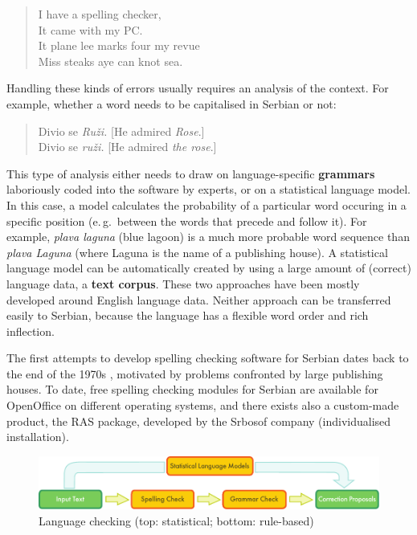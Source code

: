 \begin{multicols}{2}
\begin{quote}
 I have a spelling checker, \\
 It came with my PC. \\
 It plane lee marks four my revue \\
 Miss steaks aye can knot sea. 
\end{quote}

Handling these kinds of errors usually requires an analysis of the context. For example, whether a word needs to be capitalised in Serbian or not:

\begin{quote}
Divio se \textit{Ruži.} [He admired \textit{Rose}.]\\
Divio se \textit{ruži.} [He admired \textit{the rose}.]
\end{quote}

This type of analysis either needs to draw on language-specific \textbf{grammars} laboriously coded into the software by experts, or on a statistical language model. In this case, a model calculates the probability of a particular word occuring in a specific position (e.\,g.~between the words that precede and follow it). For example, \textit{plava laguna} (blue lagoon) is a much more probable word sequence than \textit{plava Laguna} (where Laguna is the name of a publishing house). A statistical language model can be automatically created by using a large amount of (correct) language data, a \textbf{text corpus}. These two approaches have been mostly developed around English language data. Neither approach can be transferred easily to Serbian, because the language has a flexible word order and rich inflection.


The first attempts to develop spelling checking software for Serbian dates back to the end of the 1970s \cite{UROSEVIC}, motivated by problems confronted by large publishing houses. To date, free spelling checking modules for Serbian are available for OpenOffice \cite{OpenOffice} on different operating systems, and there exists also a custom-made product, the RAS package, \cite{RASPROG} developed by the Srbosof company (individualised installation).  
 
\begin{figure}[htb]
  \center
  \includegraphics[width=\textwidth]{../_media/english/language_checking}
  \caption{Language checking (top: statistical; bottom: rule-based)}
  \label{fig:langcheckingaarch_en}
\end{figure}


\end{multicols}
